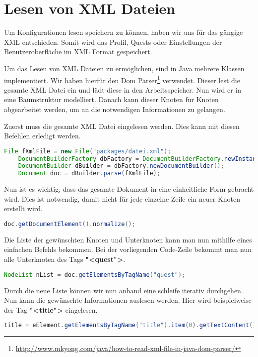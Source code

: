 \section{Lesen von XML Dateien}
Um Konfigurationen lesen speichern zu können, haben wir uns für das gängige XML entschieden. Somit wird das Profil, Quests oder Einstellungen der Benutzeroberfläche im XML Format gespeichert.

Um das Lesen von XML Dateien zu ermöglichen, sind in Java mehrere Klassen implementiert. Wir haben hierfür den Dom Parser\footnote{\url{http://www.mkyong.com/java/how-to-read-xml-file-in-java-dom-parser/}} verwendet. Dieser lest die gesamte XML Datei ein und lädt diese in den Arbeitsspeicher. Nun wird er in eine Baumstruktur modelliert. Danach kann dieser Knoten für Knoten abgearbeitet werden, um an die notwendigen Informationen zu gelangen.

Zuerst muss die gesamte XML Datei eingelesen werden. Dies kann mit diesen Befehlen erledigt werden.
\begin{lstlisting}[language=JAVA]
	File fXmlFile = new File("packages/datei.xml");
	DocumentBuilderFactory dbFactory = DocumentBuilderFactory.newInstance();
	DocumentBuilder dBuilder = dbFactory.newDocumentBuilder();
	Document doc = dBuilder.parse(fXmlFile);
\end{lstlisting}

Nun ist es wichtig, dass das gesamte Dokument in eine einheitliche Form gebracht wird. Dies ist notwendig, damit nicht für jede einzelne Zeile ein neuer Knoten erstellt wird.
\begin{lstlisting}[language=JAVA]
	doc.getDocumentElement().normalize();
\end{lstlisting}

Die Liste der gewünschten Knoten und Unterknoten kann man nun mithilfe eines einfachen Befehls bekommen. Bei der vorliegenden Code-Zeile bekommt man nun alle Unterknoten des Tags \textbf{"<quest">}.
\begin{lstlisting}[language=JAVA]
	NodeList nList = doc.getElementsByTagName("quest");
\end{lstlisting}
Durch die neue Liste können wir nun anhand eine schleife iterativ durchgehen. Nun kann die gewünschte Informationen auslesen werden. Hier wird beispielweise der Tag \textbf{"<title">} eingelesen.
\begin{lstlisting}[language=JAVA]
title = eElement.getElementsByTagName("title").item(0).getTextContent();
\end{lstlisting}

